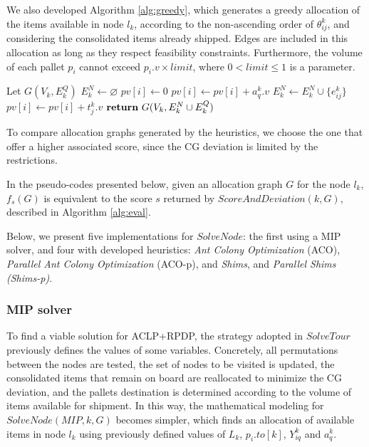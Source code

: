 \documentclass[preprint,authoryear]{elsarticle}
\begin{document}
We also developed Algorithm \ref{alg:greedy}, which generates a greedy allocation of the items available in node $l_k$, according to the non-ascending order of $\theta^k_{ij}$, and considering the consolidated items already shipped. Edges are included in this allocation as long as they respect feasibility constraints. Furthermore, the volume of each pallet $p_i$\/ cannot exceed $p_i.v \times limit$, where $ 0 < limit \leq 1$\/ is a parameter.

\begin{algorithm}[H]
	\caption{ $Greedy(k, G, limit)$}  \label{alg:greedy}

	\begin{algorithmic}[1]
		\State Let $G(V_k, E^Q_k)$
		\State $E^N_k \gets \varnothing$ 			
			\State $pv[i] \gets 0$ 		
		\EndFor
				\State $pv[i] \gets pv[i] + a_q^k.v$ 
			\EndIf		
		\EndFor		
				\State $E^N_k \gets E^N_k \cup \{e_{ij}^k\}$ 
				\State $pv[i] \gets pv[i] + t_j^k.v$ 	
			\EndIf
		\EndFor
		\State ${\bf return}\ G(V_k, E^N_k \cup E^Q_k)$
		
	\end{algorithmic}
\end{algorithm}

To compare allocation graphs generated by the heuristics, we choose the one that offer a higher associated score, since the CG deviation is limited by the restrictions.

In the pseudo-codes presented below, given an allocation graph $G$\/ for the node $l_k$, $f_s(G)$\/ is equivalent to the score $s$\/ returned by $ScoreAndDeviation(k,G) $, described in Algorithm \ref{alg:eval}.

Below, we present five implementations for $SolveNode$: the first using a MIP solver, and four with developed heuristics: {\it Ant Colony Optimization}\/ (ACO), {\it Parallel Ant Colony Optimization}\/ (ACO-p),  and {\it Shims},  and {\it Parallel Shims (Shims-p)}.



\subsubsection{MIP solver}
\label{solver}

To find a viable solution for ACLP+RPDP, the strategy adopted in $SolveTour$\/ previously defines the values of some variables. Concretely, all permutations between the nodes are tested, the set of nodes to be visited is updated, the consolidated items that remain on board are reallocated to minimize the CG deviation, and the pallets destination is determined according to the volume of items available for shipment. In this way, the mathematical modeling for $SolveNode(MIP,k,G)$\/ becomes simpler, which finds an allocation of available items in node $l_k$\/ using previously defined values of $L_k$, $p_i.to[k]$, $Y^k_{iq}$\/ and $a^k_q$. 
\end{document}
